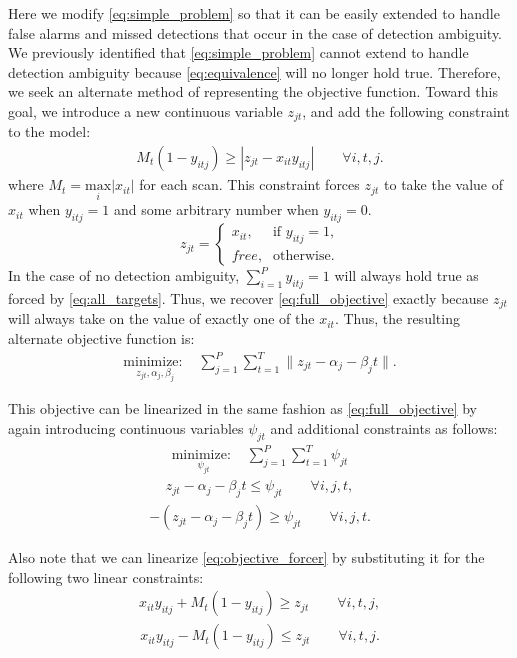 Here we modify \eqref{eq:simple_problem} so that it can be easily extended to handle false alarms and missed detections that occur in the case of detection ambiguity. We previously identified that \eqref{eq:simple_problem} cannot extend to handle detection ambiguity because \eqref{eq:equivalence} will no longer hold true. Therefore, we seek an alternate method of representing the objective function. Toward this goal, we introduce a new continuous variable $z_{jt}$, and add the following constraint to the model:
\begin{align}\label{eq:objective_forcer}
M_{t}(1-y_{itj}) \geq |z_{jt} - x_{it}y_{itj}| \qquad \forall i,t,j.
\end{align}
where $M_{t} = \underset{i}{\text{max}}|x_{it}|$ for each scan. This constraint forces $z_{jt}$ to take the value of $x_{it}$ when $y_{itj}=1$ and some arbitrary number when $y_{itj}=0$. 
\[z_{jt} =
\begin{cases}
x_{it}, & \text{if $y_{itj} = 1$,} \\
\textit{free}, & \text{otherwise.}
\end{cases}\]
In the case of no detection ambiguity, $\sum_{i=1}^{P} y_{itj} = 1$ will always hold true as forced by \eqref{eq:all_targets}. Thus, we recover \eqref{eq:full_objective} exactly because $z_{jt}$ will always take on the value of exactly one of the $x_{it}$. Thus, the resulting alternate objective function is:
\begin{align}\label{eq:generalized_objective}
\underset{z_{jt}, \alpha_{j}, \beta_{j}}{\text{minimize: }} & \sum_{j=1}^{P} \sum_{t=1}^{T} \|z_{jt} - \alpha_{j} - \beta_{j}t\|.
\end{align}

This objective can be linearized in the same fashion as \eqref{eq:full_objective} by again introducing continuous variables $\psi_{jt}$ and additional constraints as follows:
\begin{align}\label{eq:generalized_linear_objective}
\underset{\psi_{jt}}{\text{minimize: }} & \sum_{j=1}^{P} \sum_{t=1}^{T} \psi_{jt}
\end{align}
\begin{align*}
z_{jt} - \alpha_{j} - \beta_{j}t \leq \psi_{jt} \qquad \forall i,j,t,
\end{align*}
\begin{align*}
-(z_{jt} - \alpha_{j} - \beta_{j}t) \geq \psi_{jt} \qquad \forall i,j,t.
\end{align*}

Also note that we can linearize \eqref{eq:objective_forcer} by substituting it for the following two linear constraints:
\begin{align*}
x_{it}y_{itj} + M_{t}(1-y_{itj}) \geq z_{jt} \qquad \forall i,t,j,
\end{align*}
\begin{align*}
x_{it}y_{itj} - M_{t}(1-y_{itj}) \leq z_{jt} \qquad \forall i,t,j.
\end{align*}

